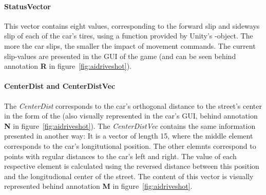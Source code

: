 \paragraph{StatusVector} This vector contains eight values, corresponding to the forward slip and sideways slip of each of the car's tires, using a function provided by Unity's -object. The more the car slips, the smaller the impact of movement commands. The current slip-values are presented in the GUI of the game (and can be seen behind annotation \textbf{R} in figure~\ref{fig:aidriveshot}).

\paragraph{CenterDist and CenterDistVec} The \emph{CenterDist} corresponds to the car's orthogonal distance to the street's center in the form of the  (also visually represented in the car's GUI, behind annotation \textbf{N} in figure~\ref{fig:aidriveshot}).
The \emph{CenterDistVec} contains the same information presented in another way: It is a vector of length 15, where the middle element corresponds to the car's longitutional position. The other elemnts correspond to points with regular distances to the car's left and right. The value of each respective element is calculated using the reversed distance between this position and the longitudional center of the street. The content of this vector is visually represented behind annotation \textbf{M} in figure~\ref{fig:aidriveshot}.

